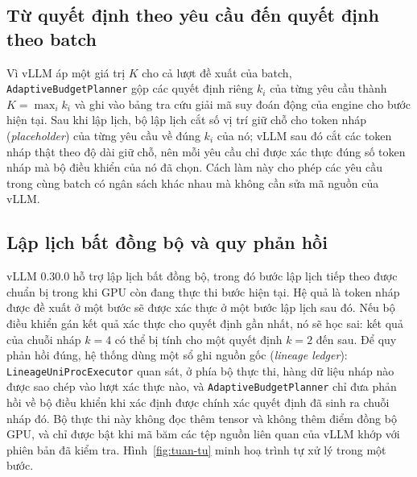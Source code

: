 \subsection{Từ quyết định theo yêu cầu đến quyết định theo batch}

Vì vLLM áp một giá trị $K$ cho cả lượt đề xuất của batch, \texttt{AdaptiveBudgetPlanner} gộp các quyết định riêng $k_i$ của từng yêu cầu thành $K = \max_i k_i$ và ghi vào bảng tra cứu giải mã suy đoán động của engine cho bước hiện tại. Sau khi lập lịch, bộ lập lịch cắt số vị trí giữ chỗ cho token nháp (\textit{placeholder}) của từng yêu cầu về đúng $k_i$ của nó; vLLM sau đó cắt các token nháp thật theo độ dài giữ chỗ, nên mỗi yêu cầu chỉ được xác thực đúng số token nháp mà bộ điều khiển của nó đã chọn. Cách làm này cho phép các yêu cầu trong cùng batch có ngân sách khác nhau mà không cần sửa mã nguồn của vLLM.

\subsection{Lập lịch bất đồng bộ và quy phản hồi}

vLLM 0.30.0 hỗ trợ lập lịch bất đồng bộ, trong đó bước lập lịch tiếp theo được chuẩn bị trong khi GPU còn đang thực thi bước hiện tại. Hệ quả là token nháp được đề xuất ở một bước sẽ được xác thực ở một bước lập lịch sau đó. Nếu bộ điều khiển gán kết quả xác thực cho quyết định gần nhất, nó sẽ học sai: kết quả của chuỗi nháp $k=4$ có thể bị tính cho một quyết định $k=2$ đến sau. Để quy phản hồi đúng, hệ thống dùng một sổ ghi nguồn gốc (\textit{lineage ledger}): \texttt{LineageUniProcExecutor} quan sát, ở phía bộ thực thi, hàng dữ liệu nháp nào được sao chép vào lượt xác thực nào, và \texttt{AdaptiveBudgetPlanner} chỉ đưa phản hồi về bộ điều khiển khi xác định được chính xác quyết định đã sinh ra chuỗi nháp đó. Bộ thực thi này không đọc thêm tensor và không thêm điểm đồng bộ GPU, và chỉ được bật khi mã băm các tệp nguồn liên quan của vLLM khớp với phiên bản đã kiểm tra. Hình~\ref{fig:tuan-tu} minh hoạ trình tự xử lý trong một bước.

